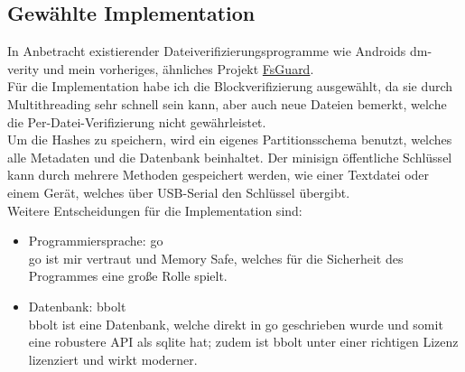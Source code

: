 \subsection{Gewählte Implementation}
In Anbetracht existierender Dateiverifizierungsprogramme wie Androids dm-verity und mein vorheriges, ähnliches Projekt \href{https://github.com/linux-immutability-tools/FsGuard}{FsGuard}.
\\
Für die Implementation habe ich die Blockverifizierung ausgewählt, da sie durch Multithreading sehr schnell sein kann, aber auch neue Dateien bemerkt, welche die Per-Datei-Verifizierung nicht gewährleistet.
\\
Um die Hashes zu speichern, wird ein eigenes Partitionsschema benutzt, welches alle Metadaten und die Datenbank beinhaltet. Der minisign öffentliche Schlüssel kann durch mehrere Methoden gespeichert werden, wie einer Textdatei oder einem Gerät, welches über USB-Serial den Schlüssel übergibt.
\\
Weitere Entscheidungen für die Implementation sind:
\begin{itemize}
\item Programmiersprache: go\\
  go ist mir vertraut und Memory Safe, welches für die Sicherheit des Programmes eine große Rolle spielt.
\item Datenbank: bbolt\\
  bbolt ist eine Datenbank, welche direkt in go geschrieben wurde und somit eine robustere API als sqlite hat; zudem ist bbolt unter einer richtigen Lizenz lizenziert und wirkt moderner.
\end{itemize}
  
